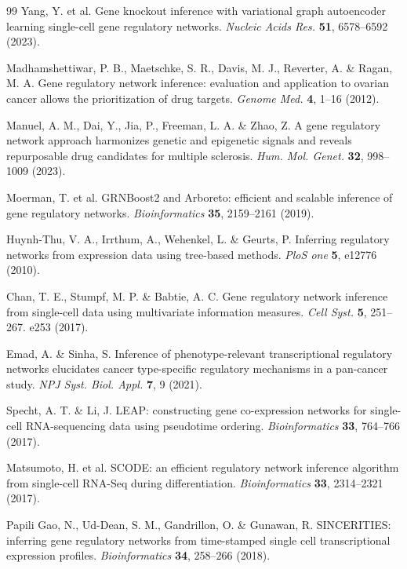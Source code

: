 \begin{singlespace}
\begin{thebibliography}{99\kern\bibindent}
Yang, Y. et al. Gene knockout inference with variational graph
autoencoder learning single-cell gene regulatory networks. \textit{Nucleic
Acids Res.} \textbf{51}, 6578–6592 (2023).

Madhamshettiwar, P. B., Maetschke, S. R., Davis, M. J., Reverter, A. \&
Ragan, M. A. Gene regulatory network inference: evaluation and
application to ovarian cancer allows the prioritization of drug targets. \textit{Genome Med.} \textbf{4}, 1–16 (2012).

Manuel, A. M., Dai, Y., Jia, P., Freeman, L. A. \& Zhao, Z. A gene
regulatory network approach harmonizes genetic and epigenetic
signals and reveals repurposable drug candidates for multiple
sclerosis. \textit{Hum. Mol. Genet.} \textbf{32}, 998–1009 (2023).

Moerman, T. et al. GRNBoost2 and Arboreto: efficient and scalable
inference of gene regulatory networks. \textit{Bioinformatics} \textbf{35},
2159–2161 (2019).

Huynh-Thu, V. A., Irrthum, A., Wehenkel, L. \& Geurts, P. Inferring
regulatory networks from expression data using tree-based methods. \textit{PloS one} \textbf{5}, e12776 (2010).

Chan, T. E., Stumpf, M. P. \& Babtie, A. C. Gene regulatory network
inference from single-cell data using multivariate information
measures. \textit{Cell Syst.} \textbf{5}, 251–267. e253 (2017).

Emad, A. \& Sinha, S. Inference of phenotype-relevant transcriptional regulatory networks elucidates cancer type-specific regulatory mechanisms in a pan-cancer study. \textit{NPJ Syst. Biol. Appl.} \textbf{7}, 9 (2021).

Specht, A. T. \& Li, J. LEAP: constructing gene co-expression networks for single-cell RNA-sequencing data using pseudotime
ordering. \textit{Bioinformatics} \textbf{33}, 764–766 (2017).

Matsumoto, H. et al. SCODE: an efficient regulatory network inference algorithm from single-cell RNA-Seq during differentiation.
\textit{Bioinformatics} \textbf{33}, 2314–2321 (2017).

Papili Gao, N., Ud-Dean, S. M., Gandrillon, O. \& Gunawan, R. SINCERITIES: inferring gene regulatory networks from time-stamped
single cell transcriptional expression profiles. \textit{Bioinformatics} \textbf{34}, 258–266 (2018).


\end{thebibliography}
\end{singlespace}
